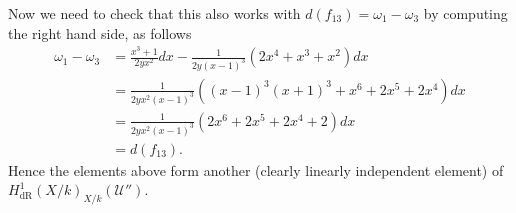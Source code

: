\documentclass[draft, 11pt]{article} %
\theoremstyle{plain}
\theoremstyle{remark}
\newcommand{\cU}{{\mathcal U}}
\newcommand{\derhamhone}{H_{\text {dR}}^1(X/k)}
\begin{document}
Now we need to check that this also works with $d(f_{13}) = \omega_1 - \omega_3$ by computing the right hand side, as follows
\begin{align}
\omega_1 - \omega_3 & = \frac{x^3+1}{2yx^2}dx - \frac{1}{2y(x-1)^3}( 2x^4+x^3+x^2) dx \\
& = \frac{1}{2yx^2(x-1)^3} ( (x-1)^3(x+1)^3 + x^6 + 2x^5 + 2x^4 ) dx \\
& = \frac{1}{2yx^2(x-1)^3}(2x^6+2x^5 + 2x^4 + 2) dx\\
& = d(f_{13}).
\end{align}
Hence the elements above form another (clearly linearly independent element) of $\derhamhone_{X/k}(\cU'')$.



\end{document}
